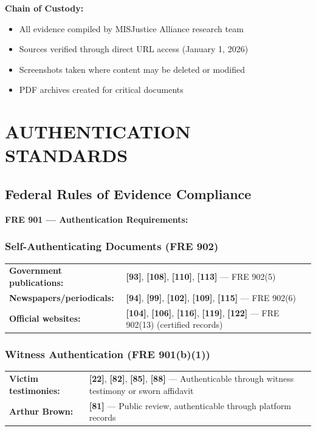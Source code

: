 \documentclass[11pt,letterpaper]{article}
\newcommand{\citeref}[1]{\textbf{\color{NavyBlue}[#1]}}
\begin{document}
\textbf{Chain of Custody:}
\begin{itemize}[leftmargin=*]
\item All evidence compiled by MISJustice Alliance research team
\item Sources verified through direct URL access (January 1, 2026)
\item Screenshots taken where content may be deleted or modified
\item PDF archives created for critical documents
\end{itemize}

\newpage

\section{AUTHENTICATION STANDARDS}

\subsection{Federal Rules of Evidence Compliance}

\textbf{FRE 901 --- Authentication Requirements:}

\subsubsection{Self-Authenticating Documents (FRE 902)}

\begin{tabular}{@{}p{2in}p{4in}@{}}
\textbf{Government publications:} & \citeref{93}, \citeref{108}, \citeref{110}, \citeref{113} --- FRE 902(5)\\
\textbf{Newspapers/periodicals:} & \citeref{94}, \citeref{99}, \citeref{102}, \citeref{109}, \citeref{115} --- FRE 902(6)\\
\textbf{Official websites:} & \citeref{104}, \citeref{106}, \citeref{116}, \citeref{119}, \citeref{122} --- FRE 902(13) (certified records)\\
\end{tabular}

\subsubsection{Witness Authentication (FRE 901(b)(1))}

\begin{tabular}{@{}p{2in}p{4in}@{}}
\textbf{Victim testimonies:} & \citeref{22}, \citeref{82}, \citeref{85}, \citeref{88} --- Authenticable through witness testimony or sworn affidavit\\
\textbf{Arthur Brown:} & \citeref{81} --- Public review, authenticable through platform records\\
\end{tabular}
\end{document}
